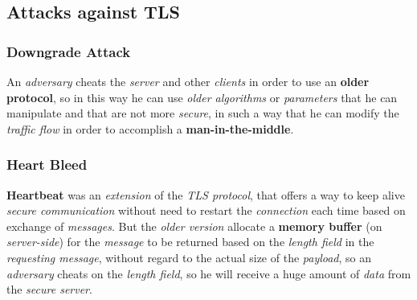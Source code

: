 \documentclass{article}
\begin{document}
\subsection{Attacks against TLS}
\subsubsection{Downgrade Attack}
An \emph{adversary} cheats the \emph{server} and other \emph{clients} in order to use an \textbf{older protocol}, so in this way he can use \emph{older algorithms} or \emph{parameters} that he can manipulate and that are not more \emph{secure}, in such a way that he can modify the \emph{traffic flow} in order to accomplish a \textbf{man-in-the-middle}. 
\subsubsection{Heart Bleed}
\textbf{Heartbeat} was an \emph{extension} of the \emph{TLS protocol}, that offers a way to keep alive \emph{secure communication} without need to restart the \emph{connection} each time based on exchange of \emph{messages}. But the \emph{older version} allocate a \textbf{memory buffer} (on \emph{server-side}) for the \emph{message} to be returned based on the \emph{length field} in the \emph{requesting message}, without regard to the actual size of the \emph{payload}, so an \emph{adversary} cheats on the \emph{length field}, so he will receive a huge amount of \emph{data} from the \emph{secure server}.
\end{document}

